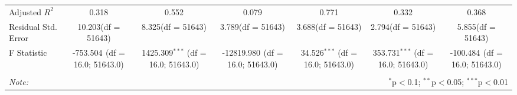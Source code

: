 \begin{table}[!htbp]
\begin{tabular}{@{\extracolsep{5pt}}lcccccc}
 Adjusted $R^2$ & 0.318 & 0.552 & 0.079 & 0.771 & 0.332 & 0.368 \\
 Residual Std. Error & 10.203(df = 51643) & 8.325(df = 51643) & 3.789(df = 51643) & 3.688(df = 51643) & 2.794(df = 51643) & 5.855(df = 51643)  \\
 F Statistic & -753.504$^{}$ (df = 16.0; 51643.0) & 1425.309$^{***}$ (df = 16.0; 51643.0) & -12819.980$^{}$ (df = 16.0; 51643.0) & 34.526$^{***}$ (df = 16.0; 51643.0) & 353.731$^{***}$ (df = 16.0; 51643.0) & -100.484$^{}$ (df = 16.0; 51643.0) \\
\hline
\hline \\[-1.8ex]
\textit{Note:} & \multicolumn{6}{r}{$^{*}$p$<$0.1; $^{**}$p$<$0.05; $^{***}$p$<$0.01} \\
\end{tabular}
\end{table}